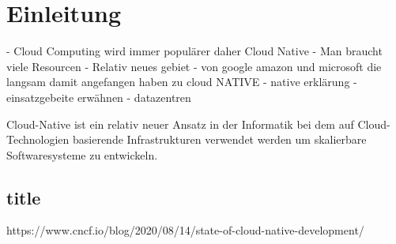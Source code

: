 \chapter{Einleitung}

- Cloud Computing wird immer populärer daher Cloud Native
- Man braucht viele Resourcen
- Relativ neues gebiet
- von google amazon und microsoft die langsam damit angefangen haben zu cloud NATIVE
- native erklärung
- einsatzgebeite erwähnen
- datazentren

Cloud-Native ist ein relativ neuer Ansatz in der Informatik bei dem auf Cloud-Technologien basierende Infrastrukturen verwendet werden um skalierbare Softwaresysteme zu entwickeln.

\section{title}

https://www.cncf.io/blog/2020/08/14/state-of-cloud-native-development/